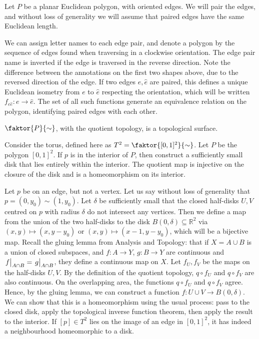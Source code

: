 \begin{example}
	Let \( P \) be a planar Euclidean polygon, with oriented edges.
	We will pair the edges, and without loss of generality we will assume that paired edges have the same Euclidean length.
	\begin{center}
		\quad
		\quad
	\end{center}
	We can assign letter names to each edge pair, and denote a polygon by the sequence of edges found when traversing in a clockwise orientation.
	The edge pair name is inverted if the edge is traversed in the reverse direction.
	Note the difference between the annotations on the first two shapes above, due to the reversed direction of the edge.
	If two edges \( e, \hat e \) are paired, this defines a unique Euclidean isometry from \( e \) to \( \hat e \) respecting the orientation, which will be written \( f_{e\hat e} \colon e \to \hat e \).
	The set of all such functions generate an equivalence relation on the polygon, identifying paired edges with each other.
	\begin{lemma}
		\( \faktor{P}{\sim} \), with the quotient topology, is a topological surface.
	\end{lemma}
	\begin{example}
		Consider the torus, defined here as \( T^2 = \faktor{[0,1]^2}{\sim} \).
		Let \( P \) be the polygon \( [0,1]^2 \).
		If \( p \) is in the interior of \( P \), then construct a sufficiently small disk that lies entirely within the interior.
		The quotient map is injective on the closure of the disk and is a homeomorphism on its interior.

		Let \( p \) be on an edge, but not a vertex.
		Let us say without loss of generality that \( p = (0,y_0) \sim (1,y_0) \).
		Let \( \delta \) be sufficiently small that the closed half-disks \( U, V \) centred on \( p \) with radius \( \delta \) do not intersect any vertices.
		Then we define a map from the union of the two half-disks to the disk \( B(0,\delta) \subseteq \mathbb R^2 \) via \( (x,y) \mapsto (x,y-y_0) \) or \( (x,y) \mapsto (x-1,y-y_0) \), which will be a bijective map.
		Recall the gluing lemma from Analysis and Topology: that if \( X = A \cup B \) is a union of closed subspaces, and \( f \colon A \to Y \), \( g \colon B \to Y \) are continuous and \( \eval{f}_{A \cap B} = \eval{g}_{A \cap B} \), they define a continuous map on \( X \).
		Let \( f_U, f_V \) be the maps on the half-disks \( U, V \).
		By the definition of the quotient topology, \( q \circ f_U \) and \( q \circ f_V \) are also continuous.
		On the overlapping area, the functions \( q \circ f_U \) and \( q \circ f_V \) agree.
		Hence, by the gluing lemma, we can construct a function \( f \colon U \cup V \to B(0, \delta) \).
		We can show that this is a homeomorphism using the usual process: pass to the closed disk, apply the topological inverse function theorem, then apply the result to the interior.
		If \( [p] \in T^2 \) lies on the image of an edge in \( [0,1]^2 \), it has indeed a neighbourhood homeomorphic to a disk.


\end{example}
\end{example}

